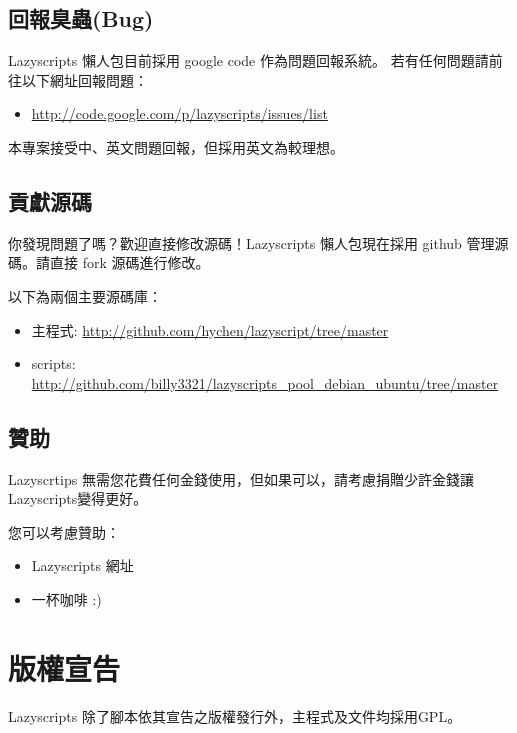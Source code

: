 \documentclass[letterpaper,10pt,english]{manual}
\begin{document}
\section{回報臭蟲(Bug)}

Lazyscripts 懶人包目前採用 google code 作為問題回報系統。
若有任何問題請前往以下網址回報問題：
\begin{itemize}
\item {} 
\href{http://code.google.com/p/lazyscripts/issues/list}{http://code.google.com/p/lazyscripts/issues/list}

\end{itemize}

本專案接受中、英文問題回報，但採用英文為較理想。


\section{貢獻源碼}

你發現問題了嗎？歡迎直接修改源碼！Lazyscripts 懶人包現在採用 github 管理源碼。請直接 fork 源碼進行修改。

以下為兩個主要源碼庫：
\begin{itemize}
\item {} 
主程式: \href{http://github.com/hychen/lazyscript/tree/master}{http://github.com/hychen/lazyscript/tree/master}

\item {} 
scripts: \href{http://github.com/billy3321/lazyscripts\_pool\_debian\_ubuntu/tree/master}{http://github.com/billy3321/lazyscripts\_pool\_debian\_ubuntu/tree/master}

\end{itemize}


\section{贊助}

Lazyscrtips 無需您花費任何金錢使用，但如果可以，請考慮捐贈少許金錢讓Lazyscripts變得更好。

您可以考慮贊助：
\begin{itemize}
\item {} 
Lazyscripts 網址

\item {} 
一杯咖啡 :)

\end{itemize}

\resetcurrentobjects


\chapter{版權宣告}

Lazyscripts 除了腳本依其宣告之版權發行外，主程式及文件均採用GPL。


\renewcommand{\indexname}{Module Index}
\printmodindex
\renewcommand{\indexname}{Index}
\printindex
\end{document}

